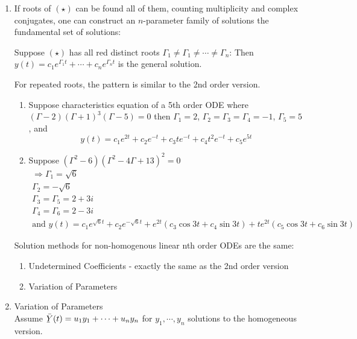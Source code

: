 \begin{enumerate}[label=\protect\circled{\arabic*}]
	\item If roots of $(\star)$ can be found all of them, counting multiplicity and complex conjugates, one can construct an $n$-parameter family of solutions the fundamental set of solutions:
	\begin{example-N}
		Suppose $(\star)$ has all red distinct roots $\Gamma_1 \neq \Gamma_1 \neq \cdots \neq \Gamma_n$: Then $y(t) = c_1e^{\Gamma_1 t} + \cdots + c_ne^{\Gamma_n t}$ is the general solution.
	\end{example-N}
	\begin{example-N}
		For repeated roots, the pattern is similar to the 2nd order version.
		\begin{enumerate}[label=\protect\circled{\alph*}]
		\item Suppose characteristics equation of a 5th order ODE where $(\Gamma - 2)(\Gamma + 1)^3(\Gamma - 5) = 0$ then $\Gamma_1 = 2$, $\Gamma_2 = \Gamma_3 = \Gamma_4 = -1$, $\Gamma_5 = 5$, and 
		\begin{equation*}
			y(t) = c_1e^{2t} + c_2 e^{-t} + c_3te^{-t} + c_4t^2e^{-t} + c_5e^{5t}
		\end{equation*}
		\item Suppose $(\Gamma^2 - 6)(\Gamma^2 - 4\Gamma + 13)^2 = 0$
		\begin{gather*}
			\Rightarrow \Gamma_1 = \sqrt{6}\\ \Gamma_2 = -\sqrt{6}\\ \Gamma_3 = \Gamma_5 = 2+3i\\
			\Gamma_4 = \Gamma_6 = 2-3i\\
			\text{and } y(t) = c_1e^{\sqrt{6}t} + c_2e^{-\sqrt{6}t} + e^{2t}(c_3 \cos 3t + c_4 \sin 3t) + te^{2t}(c_5 \cos 3t + c_6 \sin 3t)
		\end{gather*}
		\end{enumerate}	
	\end{example-N}
	Solution methods for non-homogenous linear nth order ODEs are the same:
	\begin{enumerate}[label=\protect\circled{\roman*}]
		\item Undetermined Coefficients - exactly the same as the 2nd order version
		\item Variation of Parameters
	\end{enumerate}
	\item Variation of Parameters \\
	Assume  $\Ylines(t) = u_1y_1 + \cdots + u_ny_n$ for $y_1, \cdots, y_n$ solutions to the homogeneous version.\\

\end{enumerate}
